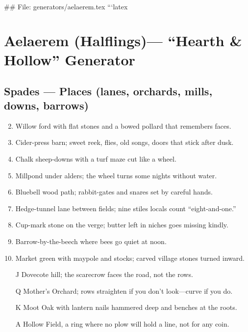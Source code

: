 ## File: generators/aelaerem.tex
```latex
\chapter{Aelaerem (Halflings)--- ``Hearth \& Hollow'' Generator}

\section*{Spades --- Places (lanes, orchards, mills, downs, barrows)}
\begin{enumerate}
\setcounter{enumi}{1}
\item Willow ford with flat stones and a bowed pollard that remembers faces.
\item Cider-press barn; sweet reek, flies, old songs, doors that stick after dusk.
\item Chalk sheep-downs with a turf maze cut like a wheel.
\item Millpond under alders; the wheel turns some nights without water.
\item Bluebell wood path; rabbit-gates and snares set by careful hands.
\item Hedge-tunnel lane between fields; nine stiles locals count ``eight-and-one.''
\item Cup-mark stone on the verge; butter left in niches goes missing kindly.
\item Barrow-by-the-beech where bees go quiet at noon.
\item Market green with maypole and stocks; carved village stones turned inward.
\item[J] Dovecote hill; the scarecrow faces the road, not the rows.
\item[Q] Mother's Orchard; rows straighten if you don't look---curve if you do.
\item[K] Moot Oak with lantern nails hammered deep and benches at the roots.
\item[A] Hollow Field, a ring where no plow will hold a line, not for any coin.
\end{enumerate}

